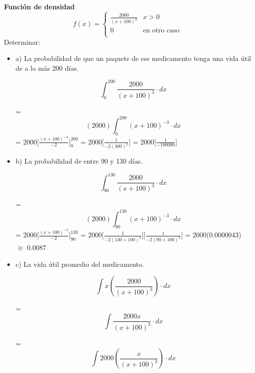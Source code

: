 \documentclass{../oxmathproblems}
\begin{document}
\begin{questions}

\miquestion\textbf{Función de densidad}
\[   
f(x) = 
     \begin{cases}
       \frac{2000}{(x+100)^3} & x > 0 \\
       0 & \text{en otro caso} \\
     \end{cases}
\]
$$$$
Determinar: 
\begin{itemize}
\item  a) La probabilidad de que un paquete de ese medicamento tenga una vida útil de a lo más 200 días. 


 \begin{equation}
\int_{0}^{200} \frac{2000}{(x+100)^3} \cdot dx
\end{equation}

= \begin{equation}
(2000 )\int_{0}^{200} (x+100)^{-3} \cdot dx
\end{equation}
= 2000[$\frac{(x+100)^{-2}}{-2}]^{200}_{0}$  = 
2000[$\frac{1}{-2(300)^2}]$ = 
2000[$\frac{1}{-180 000}]$


\item  b) La probabilidad de entre 90 y 130 días.


 \begin{equation}
\int_{90}^{130} \frac{2000}{(x+100)^3} \cdot dx
\end{equation}

= \begin{equation}
(2000 )\int_{90}^{130} (x+100)^{-3} \cdot dx
\end{equation}
= 2000[$\frac{(x+100)^{-2}}{-2}]^{130}_{90}$  = 
2000[$\frac{1}{-2(130 + 100)^2}]$[$\frac{1}{-2(90 + 100)^2}]$ = 
2000(0.0000043) $\cong$ 0.0087

\item  c) La vida útil promedio del medicamento. 

 \begin{equation}
\int x(\frac{2000}{(x+100)^3}) \cdot dx
\end{equation}

=  \begin{equation}
\int \frac{2000x}{(x+100)^3} \cdot dx
\end{equation}

=   \begin{equation}
\int 2000 (\frac{x}{(x+100)^3}) \cdot dx
\end{equation}


\end{itemize}
\end{questions}
\end{document}

